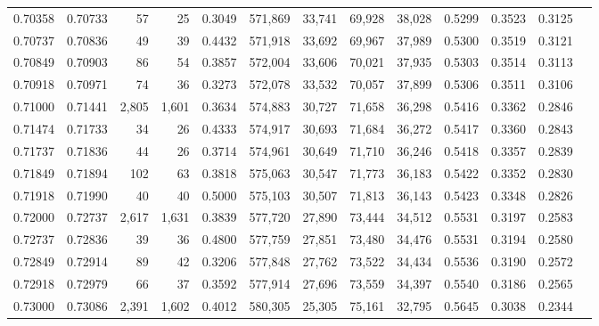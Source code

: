 \begin{tabular}{rrrrrrrrrrrrr}
0.70358 & 0.70733 &     57 &    25 &                                     0.3049 & 571,869 &  33,741 &  69,928 &  38,028 & 0.5299 & 0.3523 & 0.3125 \\
0.70737 & 0.70836 &     49 &    39 &                                     0.4432 & 571,918 &  33,692 &  69,967 &  37,989 & 0.5300 & 0.3519 & 0.3121 \\
0.70849 & 0.70903 &     86 &    54 &                                     0.3857 & 572,004 &  33,606 &  70,021 &  37,935 & 0.5303 & 0.3514 & 0.3113 \\
0.70918 & 0.70971 &     74 &    36 &                                     0.3273 & 572,078 &  33,532 &  70,057 &  37,899 & 0.5306 & 0.3511 & 0.3106 \\
0.71000 & 0.71441 &  2,805 & 1,601 &                                     0.3634 & 574,883 &  30,727 &  71,658 &  36,298 & 0.5416 & 0.3362 & 0.2846 \\
0.71474 & 0.71733 &     34 &    26 &                                     0.4333 & 574,917 &  30,693 &  71,684 &  36,272 & 0.5417 & 0.3360 & 0.2843 \\
0.71737 & 0.71836 &     44 &    26 &                                     0.3714 & 574,961 &  30,649 &  71,710 &  36,246 & 0.5418 & 0.3357 & 0.2839 \\
0.71849 & 0.71894 &    102 &    63 &                                     0.3818 & 575,063 &  30,547 &  71,773 &  36,183 & 0.5422 & 0.3352 & 0.2830 \\
0.71918 & 0.71990 &     40 &    40 &                                     0.5000 & 575,103 &  30,507 &  71,813 &  36,143 & 0.5423 & 0.3348 & 0.2826 \\
0.72000 & 0.72737 &  2,617 & 1,631 &                                     0.3839 & 577,720 &  27,890 &  73,444 &  34,512 & 0.5531 & 0.3197 & 0.2583 \\
0.72737 & 0.72836 &     39 &    36 &                                     0.4800 & 577,759 &  27,851 &  73,480 &  34,476 & 0.5531 & 0.3194 & 0.2580 \\
0.72849 & 0.72914 &     89 &    42 &                                     0.3206 & 577,848 &  27,762 &  73,522 &  34,434 & 0.5536 & 0.3190 & 0.2572 \\
0.72918 & 0.72979 &     66 &    37 &                                     0.3592 & 577,914 &  27,696 &  73,559 &  34,397 & 0.5540 & 0.3186 & 0.2565 \\
0.73000 & 0.73086 &  2,391 & 1,602 &                                     0.4012 & 580,305 &  25,305 &  75,161 &  32,795 & 0.5645 & 0.3038 & 0.2344 \\

\end{tabular}
